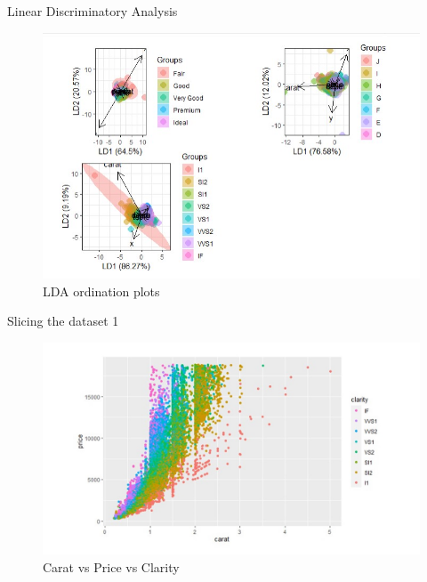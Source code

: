 \documentclass[
  ignorenonframetext,
]{beamer}
\begin{document}
\begin{frame}{Linear Discriminatory Analysis}
\protect\hypertarget{linear-discriminatory-analysis}{}
\begin{figure}
\centering
\includegraphics{./LDA ordination plots.jpg}
\caption{LDA ordination plots}
\end{figure}
\end{frame}

\begin{frame}{Slicing the dataset 1}
\protect\hypertarget{slicing-the-dataset-1}{}
\begin{figure}
\centering
\includegraphics{./coloured scatterplot carat vs price vs clarity 2.jpg}
\caption{Carat vs Price vs Clarity}
\end{figure}
\end{frame}
\end{document}
